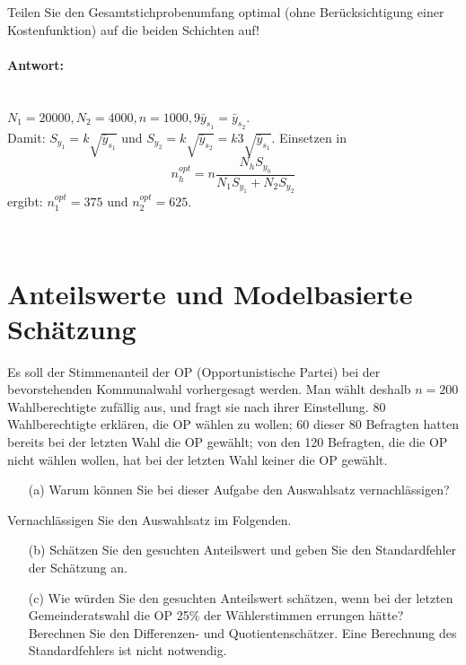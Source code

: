 \documentclass{article}
\begin{document}
Teilen Sie den Gesamtstichprobenumfang optimal (ohne Berücksichtigung einer Kostenfunktion) auf die beiden Schichten auf!
\paragraph{Antwort:}
\begin{solution} [5 Punkte]\\
$N_1 = 20000, N_2 = 4000, n=1000, 9 \bar{y}_{s_1} = \bar{y}_{s_2}$. \\Damit: $S_{y_1} = k \sqrt{\bar{y}_{s_1}}$ und $S_{y_2} = k \sqrt{\bar{y}_{s_2}} = k 3 \sqrt{\bar{y}_{s_1}}$. Einsetzen in $$n_h^{opt}=n\frac{N_h S_{y_h}}{N_1 S_{y_1}+N_2 S_{y_2}}$$ ergibt: $n_1^{opt}=375$ und $n_2^{opt}=625$.
\end{solution}
~\newpage

\section{Anteilswerte und Modelbasierte Schätzung}
Es soll der Stimmenanteil der OP (Opportunistische Partei) bei der bevorstehenden Kommunalwahl vorhergesagt werden. Man wählt deshalb $n=200$ Wahlberechtigte zufällig aus, und fragt sie nach ihrer Einstellung. 80 Wahlberechtigte erklären, die OP wählen zu wollen; 60 dieser 80 Befragten hatten bereits bei der letzten Wahl die OP gewählt; von den 120 Befragten, die die OP nicht wählen wollen, hat bei der letzten Wahl keiner die OP gewählt.
\begin{enumerate}
	\item[(a)] Warum können Sie bei dieser Aufgabe den Auswahlsatz vernachlässigen?
\end{enumerate} 
Vernachlässigen Sie den Auswahlsatz im Folgenden.
\begin{enumerate}
	\item[(b)] Schätzen Sie den gesuchten Anteilswert und geben Sie den Standardfehler der Schätzung an.
	\item[(c)] Wie würden Sie den gesuchten Anteilswert schätzen, wenn bei der letzten Gemeinderatswahl die OP 25\% der Wählerstimmen errungen hätte? Berechnen Sie den Differenzen- und Quotientenschätzer. Eine Berechnung des Standardfehlers ist nicht notwendig.
\end{enumerate}
\end{document}
